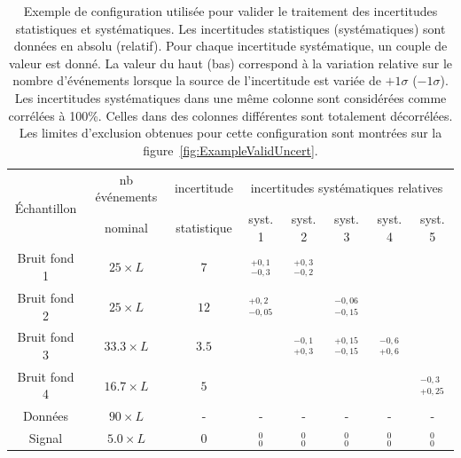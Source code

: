 \begin{table}[!htb]
\begin{center}
\begin{tabular}{c | c|c| c c c c c}
\hline\hline
\multirow{2}{*}{\'Echantillon}  &  nb \'ev\'enements   &   incertitude  & \multicolumn{5}{c}{incertitudes syst\'ematiques relatives}   \\
&  nominal  &   statistique  &  syst. 1 & syst. 2 & syst. 3 & syst. 4 & syst. 5 \\
\hline
Bruit fond 1 & $25\times L$  & $7$    &  $^{+0,1}_{-0,3}$   & $^{+0,3}_{-0,2}$  \\
\hline
Bruit fond 2 & $25\times L$  & $12$  &  $^{+0,2}_{-0,05}$  & & $^{-0,06}_{-0,15}$ \\
\hline
Bruit fond 3 & $33.3\times L$  & $3.5$    &  & $^{-0,1}_{+0,3}$ & $^{+0,15}_{-0,15}$  & $^{-0,6}_{+0,6}$  \\
\hline
Bruit fond 4 & $16.7\times L$  & $5$    &  & & & & $^{-0,3}_{+0,25}$ \\
\hline
Donn\'ees & $90\times L$   &  -  &  - & - & - & - & - \\
\hline
Signal & $5.0\times L$  &  $0$  & $^{0}_{0}$  & $^{0}_{0}$ & $^{0}_{0}$ & $^{0}_{0}$ &  $^{0}_{0}$\\
\hline
\end{tabular}
\end{center}
\caption{Exemple de configuration utilis\'ee pour valider le traitement des incertitudes statistiques et syst\'ematiques. Les incertitudes statistiques (syst\'ematiques) sont donn\'ees en absolu (relatif). Pour chaque incertitude syst\'ematique, un couple de valeur est donn\'e. La valeur du haut (bas) correspond \`a la variation relative sur le nombre d'\'ev\'enements lorsque la source de l'incertitude est vari\'ee de $+1\sigma$ ($-1\sigma$). Les incertitudes syst\'ematiques dans une m\^eme colonne sont consid\'er\'ees comme corr\'el\'ees \`a 100\%. Celles dans des colonnes diff\'erentes sont totalement d\'ecorr\'el\'ees. Les limites d'exclusion obtenues pour cette configuration sont montr\'ees sur la figure~\ref{fig:ExampleValidUncert}. \label{tab:ExampleValidUncert}}
\end{table}


